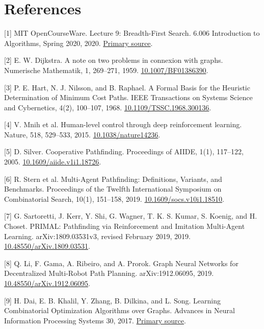 \documentclass[10pt,a4paper]{article}
\begin{document}
\section*{References}



[1] MIT OpenCourseWare. Lecture 9: Breadth-First Search. 6.006 Introduction to Algorithms, Spring 2020, 2020. \href{https://ocw.mit.edu/courses/6-006-introduction-to-algorithms-spring-2020/resources/mit6_006s20_lec9/}{Primary source}.

[2] E. W. Dijkstra. A note on two problems in connexion with graphs. Numerische Mathematik, 1, 269–271, 1959. \href{https://doi.org/10.1007/BF01386390}{10.1007/BF01386390}.

[3] P. E. Hart, N. J. Nilsson, and B. Raphael. A Formal Basis for the Heuristic Determination of Minimum Cost Paths. IEEE Transactions on Systems Science and Cybernetics, 4(2), 100–107, 1968. \href{https://doi.org/10.1109/TSSC.1968.300136}{10.1109/TSSC.1968.300136}.

[4] V. Mnih et al. Human-level control through deep reinforcement learning. Nature, 518, 529–533, 2015. \href{https://www.nature.com/articles/nature14236}{10.1038/nature14236}.

[5] D. Silver. Cooperative Pathfinding. Proceedings of AIIDE, 1(1), 117–122, 2005. \href{https://ojs.aaai.org/index.php/AIIDE/article/view/18726}{10.1609/aiide.v1i1.18726}.

[6] R. Stern et al. Multi-Agent Pathfinding: Definitions, Variants, and Benchmarks. Proceedings of the Twelfth International Symposium on Combinatorial Search, 10(1), 151–158, 2019. \href{https://arxiv.org/abs/1906.08291}{10.1609/socs.v10i1.18510}.

[7] G. Sartoretti, J. Kerr, Y. Shi, G. Wagner, T. K. S. Kumar, S. Koenig, and H. Choset. PRIMAL: Pathfinding via Reinforcement and Imitation Multi-Agent Learning. arXiv:1809.03531v3, revised February 2019, 2019. \href{https://arxiv.org/abs/1809.03531v3}{10.48550/arXiv.1809.03531}.

[8] Q. Li, F. Gama, A. Ribeiro, and A. Prorok. Graph Neural Networks for Decentralized Multi-Robot Path Planning. arXiv:1912.06095, 2019. \href{https://arxiv.org/abs/1912.06095}{10.48550/arXiv.1912.06095}.

[9] H. Dai, E. B. Khalil, Y. Zhang, B. Dilkina, and L. Song. Learning Combinatorial Optimization Algorithms over Graphs. Advances in Neural Information Processing Systems 30, 2017. \href{https://proceedings.neurips.cc/paper/2017/hash/d9896106ca98d3d05b8cbdf4fd8b13a1-Abstract.html}{Primary source}.
\end{document}
